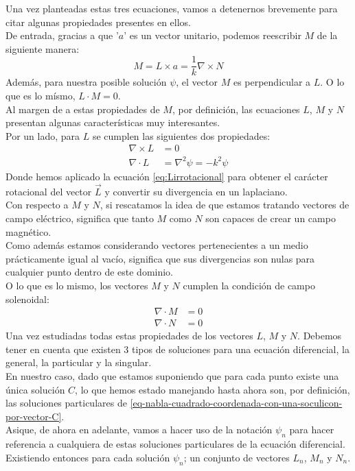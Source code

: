 \documentclass{article}
\begin{document}
Una vez planteadas estas tres ecuaciones, vamos a detenernos brevemente para citar algunas propiedades presentes en ellos.\\
De entrada, gracias a que '$a$' es un vector unitario, podemos reescribir $M$ de la siguiente manera:    
\begin{equation}
M= L \times a = \frac{1}{k}\nabla \times N
\label{eq-M-reescrito}
\end{equation}
Además,  para nuestra posible solución $\psi$, el vector $M$ es perpendicular a $L$. O lo que es lo mísmo, $L\cdot M=0$.\\

Al margen de a estas propiedades de $M$, por definición, las ecuaciones $L$, $M$ y $N$ presentan algunas características muy interesantes.\\
Por un lado, para $L$ se cumplen las siguientes dos propiedades:
\begin{align}
    \nabla  \times L &=0 \\
    \nabla  \cdot L  &=\nabla^2\psi = -k^2 \psi
\end{align}
Donde hemos aplicado la ecuación \eqref{eq:Lirrotacional} para obtener el carácter rotacional del vector $\vec{L}$ y convertir su divergencia en un laplaciano. \\
Con respecto a  $M$ y $N$, si rescatamos la idea de que estamos tratando vectores de campo eléctrico, significa que tanto $M$ como $N$ son capaces de crear un campo magnético.\\
Como además estamos considerando vectores pertenecientes a un medio prácticamente igual al vacío, significa que sus divergencias son nulas para cualquier punto dentro de este dominio.\\
O lo que es lo mismo,  los vectores $M$ y $N$ cumplen la condición de campo solenoidal:
\begin{align}
    \nabla\cdot M &= 0
    \label{M-cumplen-ser-campo-solenoidal}\\
    \nabla\cdot N &= 0
    \label{N-cumplen-ser-campo-solenoidal}
\end{align}
\newpage
Una vez estudiadas todas estas propiedades de los vectores $L$, $M$ y $N$. Debemos tener en cuenta que existen 3 tipos de soluciones para una ecuación diferencial, la general, la particular y la singular.\\
En nuestro caso, dado que estamos suponiendo que para cada punto existe una única solución $C$, lo que hemos estado manejando hasta ahora son, por definición, las soluciones particulares de \eqref{eq-nabla-cuadrado-coordenada-con-una-soculicon-por-vector-C}. \\
Asique, de ahora en adelante, vamos a hacer uso de la notación $\psi_{n}$ para hacer referencia a cualquiera de estas soluciones particulares de la ecuación diferencial. Existiendo entonces para cada solución  $\psi_{n}$; un conjunto de vectores $L_{n}$, $M_{n}$ y $N_{n}$.
\\
\end{document}

